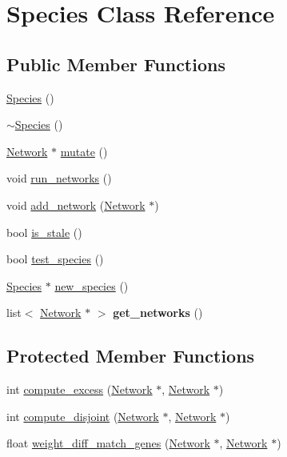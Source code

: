 \hypertarget{classSpecies}{}\section{Species Class Reference}
\label{classSpecies}
\subsection*{Public Member Functions}
\begin{DoxyCompactItemize}
\item 
\hyperlink{classSpecies_abb0f8e3208b0cc676157b7dff837c0be}{Species} ()
\item 
\hyperlink{classSpecies_af36f93648e2dedc2f05b6fb0c067f35e}{$\sim$\+Species} ()
\item 
\hyperlink{classNetwork}{Network} $\ast$ \hyperlink{classSpecies_abfce3627718863b576acc7c9de058091}{mutate} ()
\item 
void \hyperlink{classSpecies_ae79d188cf5cb0ef1d6b82e44632ebf94}{run\+\_\+networks} ()
\item 
void \hyperlink{classSpecies_a85517a1d67aad99838e5bfbe9f920aa0}{add\+\_\+network} (\hyperlink{classNetwork}{Network} $\ast$)
\item 
bool \hyperlink{classSpecies_a716e5737f0367dc4f908bab1e47cf5ac}{is\+\_\+stale} ()
\item 
bool \hyperlink{classSpecies_ad8a5df4740c1a7ac43d2f4d6e47a8092}{test\+\_\+species} ()
\item 
\hyperlink{classSpecies}{Species} $\ast$ \hyperlink{classSpecies_ad8caa0f1a2c1655483240591512a1065}{new\+\_\+species} ()
\item 
list$<$ \hyperlink{classNetwork}{Network} $\ast$ $>$ {\bfseries get\+\_\+networks} ()\hypertarget{classSpecies_aaa15bac5b5edf27f763fc45526821a3c}{}\label{classSpecies_aaa15bac5b5edf27f763fc45526821a3c}

\end{DoxyCompactItemize}
\subsection*{Protected Member Functions}
\begin{DoxyCompactItemize}
\item 
int \hyperlink{classSpecies_ae2d126bd948f511a31f20322cd2a0c37}{compute\+\_\+excess} (\hyperlink{classNetwork}{Network} $\ast$, \hyperlink{classNetwork}{Network} $\ast$)
\item 
int \hyperlink{classSpecies_a942e1e1958fb5251ef0786ce6199a17f}{compute\+\_\+disjoint} (\hyperlink{classNetwork}{Network} $\ast$, \hyperlink{classNetwork}{Network} $\ast$)
\item 
float \hyperlink{classSpecies_a732289d5916f65785694da76a26ff957}{weight\+\_\+diff\+\_\+match\+\_\+genes} (\hyperlink{classNetwork}{Network} $\ast$, \hyperlink{classNetwork}{Network} $\ast$)
\end{DoxyCompactItemize}


